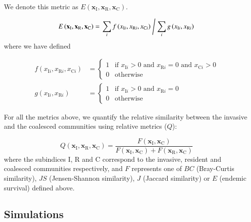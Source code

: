 \documentclass[a4paper,10pt]{article}
\begin{document}
We denote this
metric as
$E \left( \mathbf{x}_\mathrm{I},
\mathbf{x}_\mathrm{R},
\mathbf{x}_\mathrm{C} \right)$.

\begin{equation}
E \left( \mathbf{x}_\mathrm{I},
\mathbf{x}_\mathrm{R},
\mathbf{x}_\mathrm{C} \right) = 
\left.
\sum_i
f \left( x_{\mathrm{I}i}, x_{\mathrm{R}i}, x_{\mathrm{C}i} \right)
\;
\middle/
\;
\sum_i
g \left( x_{\mathrm{I}i}, x_{\mathrm{R}i} \right)
\right.
\label{eq:endemic}
\end{equation}
%
where we have defined

\begin{equation}
\begin{split}
f \left( x_{\mathrm{I}i}, x_{\mathrm{R}i}, x_{\mathrm{C}i} \right) & =
\begin{cases}
    1 & \text{if } x_{\mathrm{I}i} > 0 \text{ and }
                   x_{\mathrm{R}i} = 0 \text{ and }
                   x_{\mathrm{C}i} > 0 \\
    0 & \text{otherwise}
\end{cases} \\
g \left( x_{\mathrm{I}i}, x_{\mathrm{R}i} \right) & =
\begin{cases}
    1 & \text{if } x_{\mathrm{I}i} > 0 \text{ and }
                   x_{\mathrm{R}i} = 0 \\
    0 & \text{otherwise}
\end{cases}
\end{split}
\label{eq:endemic-f}
\end{equation}

\fi

For all the metrics above, we quantify the relative similarity between the invasive
and the coalesced communities using relative metrics ($Q$):

\begin{equation}
Q \left( \mathbf{x}_\mathrm{I},
\mathbf{x}_\mathrm{R},
\mathbf{x}_\mathrm{C} \right) = 
\frac{F \left( \mathbf{x}_\mathrm{I},\mathbf{x}_\mathrm{C}\right)}
{F \left( \mathbf{x}_\mathrm{I},\mathbf{x}_\mathrm{C}\right)
+
F \left( \mathbf{x}_\mathrm{R},\mathbf{x}_\mathrm{C}\right)}
\label{eq:q}
\end{equation}
%
where the subindices I, R and C correspond to the invasive, resident and coalesced
communities respectively, and $F$ represents one of $BC$ (Bray-Curtis similarity), $JS$
(Jensen-Shannon similarity), $J$ (Jaccard similarity) or $E$ (endemic survival) defined above.

\subsection*{Simulations}\label{methods:sim}
\end{document}

